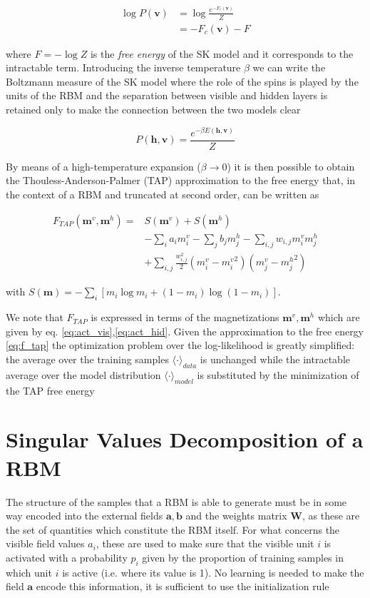 \documentclass{revtex4-1}
\begin{document}
\begin{align}
\log P(\mathbf{v}) &= \log \frac{e^{-F_c(\mathbf{v})}}{Z} \\ \nonumber
&= -F_c(\mathbf{v}) - F
\end{align}

where \( \textstyle F = - \log Z \) is the \textit{free energy} of the SK model and it corresponds to the intractable term. Introducing the inverse temperature \(\beta\) we can write the Boltzmann measure of the SK model where the role of the spins is played by the units of the RBM and the separation between visible and hidden layers is retained only to make the connection between the two models clear

\begin{equation}
P(\textbf{h},\textbf{v}) = \frac{e^{- \beta E(\textbf{h},\textbf{v})}}{Z}
\end{equation}

By means of a high-temperature expansion (\(\beta \to 0\)) \cite{ht_exp} it is then possible to obtain the Thouless-Anderson-Palmer (TAP) approximation to the free energy \cite{TAP} that, in the context of a RBM and truncated at second order, can be written as

\begin{align}
F_{TAP}(\mathbf{m}^v,\mathbf{m}^h) = & S(\mathbf{m}^v) + S(\mathbf{m}^h)\\ \nonumber
&- \sum_i a_i m_i^v - \sum_j b_j m_j^h - \sum_{i,j} w_{i,j} m_i^v m_j^h \\ \nonumber
&+ \sum_{i,j} \frac{w_{i,j}^2}{2} \left( m_i^v - {m_i^v}^2 \right) \left(m_j^v - {m_j^h}^2 \right)
\label{eq:f_tap}
\end{align}

with \( \textstyle S(\mathbf{m}) = - \sum_i \left[ m_i \log m_i + (1 - m_i) \log (1 - m_i) \right] \).

We note that \(F_{TAP}\) is expressed in terms of the magnetizations \(\mathbf{m}^v, \mathbf{m}^h\) which are given by eq. \eqref{eq:act_vis},\eqref{eq:act_hid}. Given the approximation to the free energy \eqref{eq:f_tap} the optimization problem over the log-likelihood is greatly simplified: the average over the training samples \(\langle \cdot \rangle_{data}\) is unchanged while the intractable average over the model distribution \(\langle \cdot \rangle_{model}\) is substituted by the minimization of the TAP free energy


\section{Singular Values Decomposition of a RBM}
The structure of the samples that a RBM  is able to generate must be in some way encoded into the external fields \(\mathbf{a},\mathbf{b}\) and the weights matrix \(\mathbf{W}\), as these are the set of quantities which constitute the RBM itself. For what concerns the visible field values \(a_i\), these are used to make sure that the visible unit \(i\) is activated with a probability \(p_i\) given by the proportion of training samples in which unit \(i\) is active (i.e. where its value is 1). No learning is needed to make the field \(\mathbf{a}\) encode this information, it is sufficient to use the initialization rule
\end{document}
